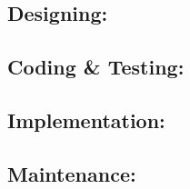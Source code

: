\documentclass{article}
\begin{document}
		\subsection{Designing:}
		\subsection{Coding \& Testing:}
		\subsection{Implementation:}
		\subsection{Maintenance:}
\end{document}
